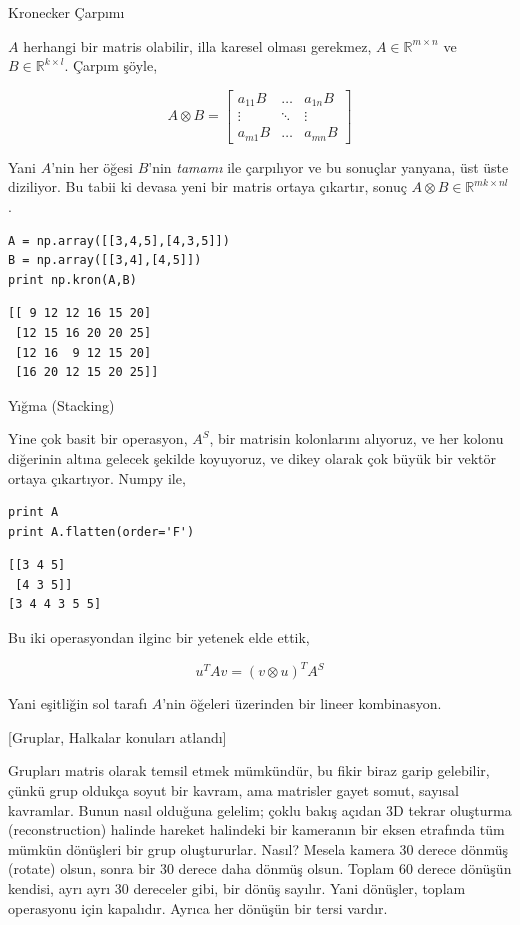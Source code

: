 \documentclass[12pt,fleqn]{article}\usepackage{../../common}
\begin{document}
Kronecker Çarpımı

$A$ herhangi bir matris olabilir, illa karesel olması gerekmez, 
$A \in \mathbb{R}^{m \times n }$ ve $B \in \mathbb{R}^{k \times l }$. 
Çarpım şöyle,

$$ A \otimes B =  
\left[\begin{array}{ccc} 
a_{11}B & \dots & a_{1n}B \\ 
\vdots & \ddots & \vdots \\
a_{m1}B & \dots & a_{mn}B
\end{array}\right]
$$

Yani $A$'nin her öğesi $B$'nin {\em tamamı} ile çarpılıyor ve bu sonuçlar
yanyana, üst üste diziliyor. Bu tabii ki devasa yeni bir matris ortaya
çıkartır, sonuç $A \otimes B \in \mathbb{R}^{mk \times nl}$. 


\begin{verbatim}
A = np.array([[3,4,5],[4,3,5]])
B = np.array([[3,4],[4,5]])
print np.kron(A,B)
\end{verbatim}

\begin{verbatim}
[[ 9 12 12 16 15 20]
 [12 15 16 20 20 25]
 [12 16  9 12 15 20]
 [16 20 12 15 20 25]]
\end{verbatim}

Yığma (Stacking)

Yine çok basit bir operasyon, $A^S$, bir matrisin kolonlarını alıyoruz, ve
her kolonu diğerinin altına gelecek şekilde koyuyoruz, ve dikey olarak çok
büyük bir vektör ortaya çıkartıyor. Numpy ile,

\begin{verbatim}
print A
print A.flatten(order='F')
\end{verbatim}

\begin{verbatim}
[[3 4 5]
 [4 3 5]]
[3 4 4 3 5 5]
\end{verbatim}

Bu iki operasyondan ilginc bir yetenek elde ettik, 

$$ u^T A v = ( v \otimes  u)^T A^S $$

Yani eşitliğin sol tarafı $A$'nin öğeleri üzerinden bir lineer
kombinasyon. 

[Gruplar, Halkalar konuları atlandı]

Grupları matris olarak temsil etmek mümkündür, bu fikir biraz garip
gelebilir, çünkü grup oldukça soyut bir kavram, ama matrisler gayet somut,
sayısal kavramlar. Bunun nasıl olduğuna gelelim; çoklu bakış açıdan 3D
tekrar oluşturma (reconstruction) halinde hareket halindeki bir kameranın
bir eksen etrafında tüm mümkün dönüşleri bir grup oluştururlar. Nasıl?
Mesela kamera 30 derece dönmüş (rotate) olsun, sonra bir 30 derece daha
dönmüş olsun. Toplam 60 derece dönüşün kendisi, ayrı ayrı 30 dereceler
gibi, bir dönüş sayılır. Yani dönüşler, toplam operasyonu için
kapalıdır. Ayrıca her dönüşün bir tersi vardır.
\end{document}
